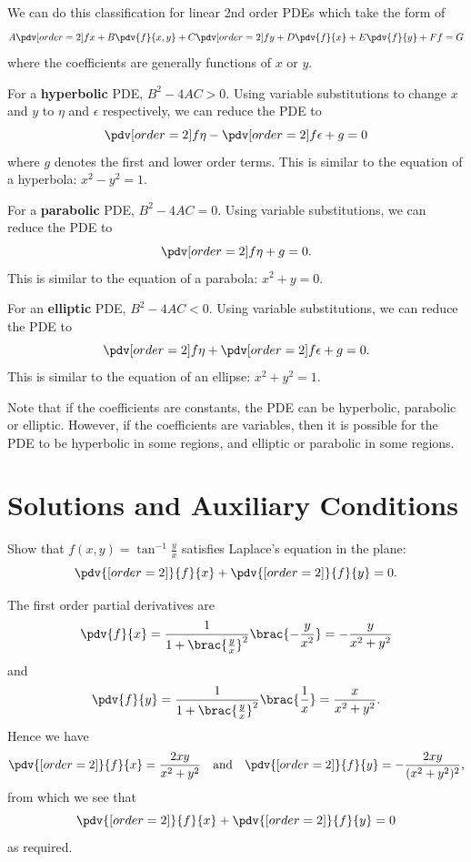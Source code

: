 \begin{itemize}
We can do this classification for linear 2nd order PDEs which take the form of 
\[ A\pdv[order={2}]{f}{x} + B\pdv{f}{x,y} + C\pdv[order={2}]{f}{y} + D\pdv{f}{x} + E\pdv{f}{y} + Ff = G \]
where the coefficients are generally functions of $x$ or $y$.

For a \textbf{hyperbolic} PDE, $B^2-4AC>0$. Using variable substitutions to change $x$ and $y$ to $\eta$ and $\epsilon$ respectively, we can reduce the PDE to \[ \pdv[order={2}]{f}{\eta} - \pdv[order={2}]{f}{\epsilon} + g = 0 \] where $g$ denotes the first and lower order terms. This is similar to the equation of a hyperbola: $x^2-y^2=1$.

For a \textbf{parabolic} PDE, $B^2-4AC=0$. Using variable substitutions, we can reduce the PDE to \[ \pdv[order={2}]{f}{\eta} + g = 0. \] This is similar to the equation of a parabola: $x^2+y=0$.

For an \textbf{elliptic} PDE, $B^2-4AC<0$. Using variable substitutions, we can reduce the PDE to \[ \pdv[order={2}]{f}{\eta} + \pdv[order={2}]{f}{\epsilon} + g = 0. \] This is similar to the equation of an ellipse: $x^2+y^2=1$.

Note that if the coefficients are constants, the PDE can be hyperbolic, parabolic or elliptic. However, if the coefficients are variables, then it is possible for the PDE to be hyperbolic in some regions, and elliptic or parabolic in some regions.
\end{itemize}

\section{Solutions and Auxiliary Conditions}
\begin{exercise}
Show that $f(x,y)=\tan^{-1}\frac{y}{x}$ satisfies Laplace's equation in the plane:
\[ \pdv{[order={2}]}{f}{x}+\pdv{[order={2}]}{f}{y}=0. \]
\end{exercise}

\begin{solution}
The first order partial derivatives are
\[ \pdv{f}{x}=\frac{1}{1+\brac{\frac{y}{x}}^2}\brac{-\frac{y}{x^2}}=-\frac{y}{x^2+y^2} \]
and
\[ \pdv{f}{y}=\frac{1}{1+\brac{\frac{y}{x}}^2}\brac{\frac{1}{x}}=\frac{x}{x^2+y^2}. \]
Hence we have
\[ \pdv{[order={2}]}{f}{x}=\frac{2xy}{x^2+y^2} \quad \text{and} \quad \pdv{[order={2}]}{f}{y}=-\frac{2xy}{(x^2+y^2)^2}, \]
from which we see that
\[ \pdv{[order={2}]}{f}{x}+\pdv{[order={2}]}{f}{y}=0 \]
as required.
\end{solution}

